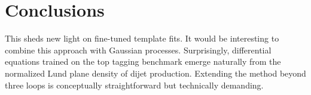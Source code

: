 \section{Conclusions}\label{sec:conclusions}

This sheds new light on fine-tuned template fits. It would be
interesting to combine this approach with Gaussian processes.
Surprisingly, differential equations trained on the top tagging
benchmark emerge naturally from the normalized Lund plane density of
dijet production. Extending the method beyond three loops is
conceptually straightforward but technically demanding.

